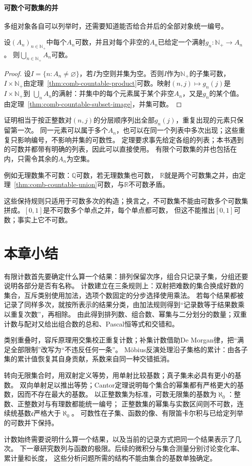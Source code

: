 \paragraph{可数个可数集的并}
多组对象各自可以列举时，还需要知道能否给合并后的全部对象统一编号。
\begin{theorem}[可数并的可数性]
\label{thm:comb-countable-union}
设$(A_n)_{n\in\mathbb N_+}$中每个$A_n$可数，并且对每个非空的$A_n$已给定一个满射$g_n:\mathbb N_+\to A_n$。
则$\bigcup_{n\in\mathbb N_+}A_n$可数。
\end{theorem}
\begin{proof}
设$I=\{n:A_n\neq\varnothing\}$，若$I$为空则并集为空。否则$I$作为$\mathbb N_+$的子集可数，
$I\times\mathbb N_+$由定理~\ref{thm:comb-countable-product}可数。映射$(n,j)\mapsto g_n(j)$是$I\times\mathbb N_+$到
$\bigcup_nA_n$的满射：并集中的每个元素属于某个非空$A_n$，又是$g_n$的某个值。
由定理~\ref{thm:comb-countable-subset-image}，并集可数。
\end{proof}
证明相当于按正整数对$(n,j)$的分层顺序列出全部$g_n(j)$，重复出现的元素只保留第一次。
同一元素可以属于多个$A_n$，也可以在同一个列表中多次出现；这些重复只影响编号，不影响并集的可数性。
定理要求事先给定各组的列表；本书遇到的可数并都带有明确的列表，因此可以直接使用。
有限个可数集的并也包括在内，只需令其余的$A_n$为空集。

例如无理数集不可数：$\mathbb Q$可数，若无理数集也可数，
$\mathbb R$就是两个可数集之并，由定理~\ref{thm:comb-countable-union}可数，与$\mathbb R$不可数矛盾。

这些保持规则只适用于可数多次的构造；换言之，不可数集不能由可数多个可数集拼成。$[0,1]$是不可数多个单点之并，每个单点都可数，
但这不能推出$[0,1]$可数；事实上它不可数。

\section{本章小结}
\label{sec:comb-summary}

有限计数首先要确定什么算一个结果：排列保留次序，组合只记录子集，分组还要说明各部分是否有名称。
计数建立在三条规则上：双射把难数的集合换成好数的集合，互斥类别使用加法，选项个数固定的分步选择使用乘法。
若每个结果都被记录了同样多次，就按所表示的结果分类，由加法规则得到“记录数等于结果数乘以重复次数”，再相除。
由此得到排列数、组合数、幂集与二分划分的数量；双重计数与配对又给出组合数的总和、Pascal恒等式和交错和。

类别重叠时，容斥原理用交集校正重复计数；补集计数借助De Morgan律，把“满足全部限制”改写为“不违反任何一条”。
Möbius反演处理沿子集格的累计：由各子集的累计值恢复其自身贡献，系数来自同一种交错抵消。

转向无限集合时，用双射定义等势，用单射比较基数；真子集未必具有更小的基数。
双向单射足以推出等势；Cantor定理说明每个集合的幂集都有严格更大的基数，因而不存在最大的基数。
以正整数集为标准，可数无限集的基数为$\aleph_0$：整数、正整数对与有理数都能统一编号；
正整数集的幂集与实数区间则不可数，连续统基数$\mathfrak c$严格大于$\aleph_0$。
可数性在子集、函数的像、有限笛卡尔积与已给定列举的可数并下保持。

计数始终需要说明什么算一个结果，以及当前的记录方式把同一个结果表示了几次。
下一章研究数列与函数的极限。后续的微积分与集合测量分别讨论变化率、累计量和长度，
这些分析问题所需的结构不能由集合的基数单独确定。
